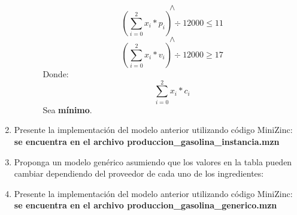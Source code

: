 \documentclass[12pt]{article}
\begin{document}
\begin{enumerate}[label=\alph*]
\begin{justify}
\begin{itemize}
\begin{itemize}
\begin{equation*}
\land
\end{equation*}
\begin{equation*}
(\sum_{i = 0}^{2} x_{i} * p_{i}) \div 12000 \leq 11
\end{equation*}
\begin{equation*}
\land
\end{equation*}
\begin{equation*}
(\sum_{i = 0}^{2} x_{i} * v_{i}) \div 12000 \geq 17
\end{equation*}
Donde:
\begin{equation*}
\sum_{i = 0}^{2} x_{i} * c_{i}
\end{equation*}
Sea \textbf{mínimo}.
\end{itemize}
\end{itemize}
\end{justify}
\item Presente la implementación del modelo anterior utilizando código MiniZinc: \textbf{se encuentra en el archivo produccion\_gasolina\_instancia.mzn}
\item Proponga un modelo genérico asumiendo que los valores en la tabla pueden cambiar dependiendo del
proveedor de cada uno de los ingredientes:
\item Presente la implementación del modelo anterior utilizando código MiniZinc: \textbf{se encuentra en el archivo produccion\_gasolina\_generico.mzn}
\end{enumerate}
\end{document}
